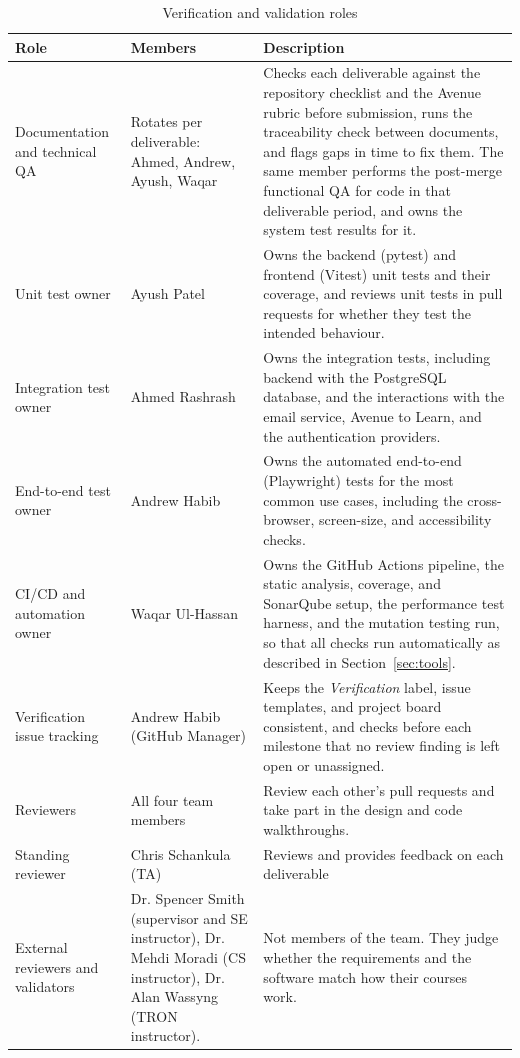 \documentclass[12pt, titlepage]{article}
\begin{document}
  \begin{table}[h!]
    \centering
    \renewcommand{\arraystretch}{1.2}
    \begin{tabularx}{\textwidth}{>{\raggedright\arraybackslash}p{3.3cm} >{\raggedright\arraybackslash}p{3.3cm} X}
      \toprule
      \textbf{Role} & \textbf{Members} & \textbf{Description}\\
      \midrule
      Documentation and technical QA & Rotates per deliverable: Ahmed, Andrew, Ayush, Waqar &
      Checks each deliverable against the repository checklist and the Avenue rubric before submission,
      runs the traceability check between documents, and flags gaps in time to fix them.
      The same member performs the post-merge functional QA for code in that deliverable period,
      and owns the system test results for it.\\
      \addlinespace
      Unit test owner & Ayush Patel &
      Owns the backend (pytest) and frontend (Vitest) unit tests and their coverage, and reviews unit tests in
      pull requests for whether they test the intended behaviour.\\
      \addlinespace
      Integration test owner & Ahmed Rashrash &
      Owns the integration tests, including backend with the PostgreSQL database, and the interactions
      with the email service, Avenue to Learn, and the authentication providers.\\
      \addlinespace
      End-to-end test owner & Andrew Habib &
      Owns the automated end-to-end (Playwright) tests for the most common use cases, including the cross-browser, screen-size, and accessibility checks.\\
      \addlinespace
      CI/CD and automation owner & Waqar Ul-Hassan &
      Owns the GitHub Actions pipeline, the static analysis, coverage, and
      SonarQube setup, the performance test harness, and the mutation testing run,
      so that all checks run automatically as described in Section~\ref{sec:tools}.\\
      \addlinespace
      Verification issue tracking & Andrew Habib (GitHub Manager) &
      Keeps the \emph{Verification} label, issue templates, and project board consistent,
      and checks before each milestone that no review finding is left open or unassigned.\\
      \addlinespace
      Reviewers & All four team members &
      Review each other's pull requests and take part in the design and code walkthroughs. \\
      \addlinespace
      Standing reviewer & Chris Schankula (TA) &
      Reviews and provides feedback on each deliverable\\
      \addlinespace
      External reviewers and validators & Dr. Spencer Smith (supervisor and SE instructor), Dr. Mehdi Moradi (CS instructor), Dr. Alan Wassyng (TRON instructor). &
      Not members of the team. They judge whether the requirements and the software match how their courses work.\\
      \bottomrule
    \end{tabularx}
    \caption{Verification and validation roles}
    \label{tab:vv-team}
  \end{table}
\end{document}

